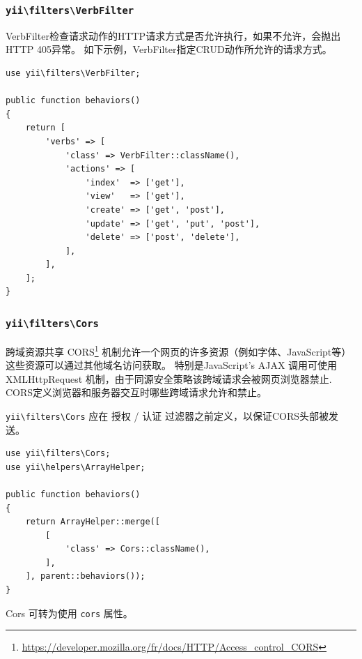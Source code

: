 \subsubsection{\texttt{yii{\allowbreak{}\textbackslash}filters{\allowbreak{}\textbackslash}VerbFilter} \label{structure-filters.md::verb-filter}}
VerbFilter检查请求动作的HTTP请求方式是否允许执行，如果不允许，会抛出HTTP 405异常。
如下示例，VerbFilter指定CRUD动作所允许的请求方式。

\lstset{language=php}\begin{lstlisting}
use yii\filters\VerbFilter;

public function behaviors()
{
    return [
        'verbs' => [
            'class' => VerbFilter::className(),
            'actions' => [
                'index'  => ['get'],
                'view'   => ['get'],
                'create' => ['get', 'post'],
                'update' => ['get', 'put', 'post'],
                'delete' => ['post', 'delete'],
            ],
        ],
    ];
}
\end{lstlisting}
\subsubsection{\texttt{yii{\allowbreak{}\textbackslash}filters{\allowbreak{}\textbackslash}Cors} \label{structure-filters.md::cors}}
跨域资源共享 CORS\footnote{\url{https://developer.mozilla.org/fr/docs/HTTP/Access\_control\_CORS}} 机制允许一个网页的许多资源（例如字体、JavaScript等）
这些资源可以通过其他域名访问获取。
特别是JavaScript's AJAX 调用可使用 XMLHttpRequest 机制，由于同源安全策略该跨域请求会被网页浏览器禁止.
CORS定义浏览器和服务器交互时哪些跨域请求允许和禁止。

\texttt{yii{\allowbreak{}\textbackslash}filters{\allowbreak{}\textbackslash}Cors} 应在 授权 / 认证 过滤器之前定义，以保证CORS头部被发送。

\lstset{language=php}\begin{lstlisting}
use yii\filters\Cors;
use yii\helpers\ArrayHelper;

public function behaviors()
{
    return ArrayHelper::merge([
        [
            'class' => Cors::className(),
        ],
    ], parent::behaviors());
}
\end{lstlisting}
Cors 可转为使用 \lstinline|cors| 属性。

